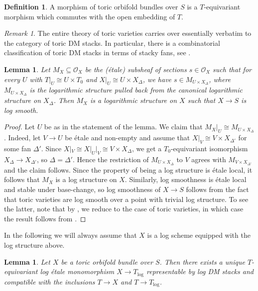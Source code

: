 \documentclass[11pt]{amsart}
\newtheorem{lemma}[theorem]{Lemma}
\theoremstyle{definition}
\newtheorem{definition}[theorem]{Definition}
\theoremstyle{remark}
\newtheorem{remark}[theorem]{Remark}
\def\log{\mathrm{log}}
\begin{document}
\begin{definition}
	A morphism of toric orbifold bundles over $S$ is a $T$-equivariant
	morphism which commutes with the open embedding of $T$.
\end{definition}

\begin{remark}
	The entire theory of toric varieties carries over essentially
	verbatim to the category of toric DM stacks. In particular,
	there is a combinatorial classification of toric DM stacks
	in terms of stacky fans, see
	\cite[Theorem 3.10.7]{ATheoryOfStaGillam2015}.
\end{remark}

\begin{lemma}
	Let $M_X\subseteq\mathcal{O}_X$ be the (étale) subsheaf of sections $s\in \mathcal{O}_X$
	such that for every $U$ with $T|_U\cong U\times T_0$ and $X|_U\cong U\times X_{\Delta}$, we have $s\in M_{U\times X_{\Delta}}$,
	where $M_{U\times X_{\Delta}}$ is the logarithmic structure pulled back from the canonical logarithmic structure on $X_{\Delta}$.
	Then $M_X$ is a logarithmic structure on $X$ such that $X\to S$ is log smooth.
\end{lemma}

\begin{proof}
	Let $U$ be as in the statement of the lemma. We claim that $M_X|_U\cong M_{U\times X_{\Delta}}$. Indeed,
	let $V\to U$ be étale and non-empty and assume that $X|_V\cong V\times X_{\Delta'}$ for some fan $\Delta'$.
	Since $X|_V\cong X|_U|_V\cong V\times X_{\Delta}$, we get a $T_0$-equivariant isomorphism $X_{\Delta}\to X_{\Delta'}$,
	so $\Delta=\Delta'$. Hence the restriction of $M_{U\times X_{\Delta}}$ to $V$ agrees with $M_{V\times X_{\Delta'}}$
	and the claim follows. Since the property of being a log structure is étale local, it follows that $M_X$ is a
	log structure on $X$. Similarly, log smoothness is étale local and stable under base-change, so log smoothness
	of $X\to S$ follows from the fact that toric varieties are log smooth over a point with trivial log structure.
	To see the latter, note that by \cite[Proposition 2.6.4]{ATheoryOfStaGillam2015},
	we reduce to the case of toric varieties, in which case the
	result follows from \cite[Theorem 3.1.8]{ogus}.
\end{proof}

In the following we will always assume that $X$ is a log scheme equipped with the log structure above.

\begin{lemma}
	\label{lem:exist_unique_map}
	Let $X$ be a toric orbifold bundle over $S$. Then there exists a unique $T$-equivariant log étale monomorphism
	$X\to T_{\log}$ representable by log DM stacks and compatible with the inclusions $T\to X$ and $T\to T_{\log}$.
\end{lemma}
\end{document}
